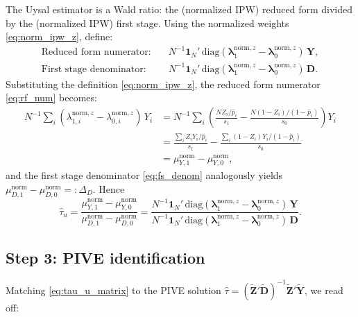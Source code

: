 \documentclass[12pt, a4paper]{article}
\theoremstyle{condstyle}
\theoremstyle{plain}
\newcommand{\bone}{\mathbf{1}_N}
\newcommand{\that}[1]{\hat{\tau}_{#1}}
\newcommand{\phat}{\hat{p}}
\begin{document}
The Uysal estimator is a Wald ratio: the (normalized IPW) reduced form
divided by the (normalized IPW) first stage.
Using the normalized weights \eqref{eq:norm_ipw_z}, define:
\begin{align}
  \text{Reduced form numerator:}&\quad
    N^{-1}\bone'\,\mathrm{diag}(\boldsymbol{\lambda}_1^{\mathrm{norm},z} - \boldsymbol{\lambda}_0^{\mathrm{norm},z})\,\mathbf{Y},
  \label{eq:rf_num}\\[4pt]
  \text{First stage denominator:}&\quad
    N^{-1}\bone'\,\mathrm{diag}(\boldsymbol{\lambda}_1^{\mathrm{norm},z} - \boldsymbol{\lambda}_0^{\mathrm{norm},z})\,\mathbf{D}.
  \label{eq:fs_denom}
\end{align}
Substituting the definition \eqref{eq:norm_ipw_z}, the reduced form numerator
\eqref{eq:rf_num} becomes:
\begin{align*}
  N^{-1}\sum_i (\lambda_{1,i}^{\mathrm{norm},z} - \lambda_{0,i}^{\mathrm{norm},z})\,Y_i
  &= N^{-1}\sum_i \left(\frac{N Z_i/\phat_i}{s_1} - \frac{N(1-Z_i)/(1-\phat_i)}{s_0}\right) Y_i\\
  &= \frac{\sum_i Z_i Y_i/\phat_i}{s_1} - \frac{\sum_i (1-Z_i)Y_i/(1-\phat_i)}{s_0}\\
  &= \mu_{Y,1}^{\mathrm{norm}} - \mu_{Y,0}^{\mathrm{norm}},
\end{align*}
and the first stage denominator \eqref{eq:fs_denom} analogously yields
$\mu_{D,1}^{\mathrm{norm}} - \mu_{D,0}^{\mathrm{norm}} =: \Delta_D$.
Hence
\begin{equation}
  \that{u}
  = \frac{\mu_{Y,1}^{\mathrm{norm}} - \mu_{Y,0}^{\mathrm{norm}}}{\mu_{D,1}^{\mathrm{norm}} - \mu_{D,0}^{\mathrm{norm}}}
  = \frac{N^{-1}\bone'\,\mathrm{diag}(\boldsymbol{\lambda}_1^{\mathrm{norm},z} - \boldsymbol{\lambda}_0^{\mathrm{norm},z})\,\mathbf{Y}}%
         {N^{-1}\bone'\,\mathrm{diag}(\boldsymbol{\lambda}_1^{\mathrm{norm},z} - \boldsymbol{\lambda}_0^{\mathrm{norm},z})\,\mathbf{D}}.
  \label{eq:tau_u_matrix}
\end{equation}

\subsection{Step 3: PIVE identification}
\label{ssec:u_step3}

Matching \eqref{eq:tau_u_matrix} to the PIVE solution
$\hat\tau = (\tilde{\mathbf{Z}}'\tilde{\mathbf{D}})^{-1}\tilde{\mathbf{Z}}'\tilde{\mathbf{Y}}$,
we read off:
\end{document}
